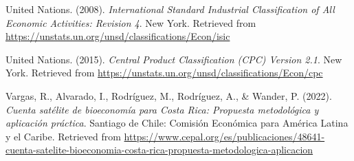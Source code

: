 \documentclass[
  letterpaper,
  DIV=11,
  numbers=noendperiod]{scrartcl}
\newlength{\cslhangindent}
\newenvironment{CSLReferences}[2] %
 {\begin{list}{}{%
  \setlength{\itemindent}{0pt}
  \setlength{\leftmargin}{0pt}
  \setlength{\parsep}{0pt}
  \ifodd #1
   \setlength{\leftmargin}{\cslhangindent}
   \setlength{\itemindent}{-1\cslhangindent}
  \fi
  \setlength{\itemsep}{#2\baselineskip}}}
 {\end{list}}
\begin{document}
\begin{CSLReferences}{1}{0}
United Nations. (2008). \emph{{International} {Standard} {Industrial}
{Classification} of {All} {Economic} {Activities}: {Revision} 4}. New
York. Retrieved from
\url{https://unstats.un.org/unsd/classifications/Econ/isic}

United Nations. (2015). \emph{{Central} {Product} {Classification} (CPC)
{Version} 2.1}. New York. Retrieved from
\url{https://unstats.un.org/unsd/classifications/Econ/cpc}

Vargas, R., Alvarado, I., Rodríguez, M., Rodríguez, A., \& Wander, P.
(2022). \emph{Cuenta satélite de bioeconomía para Costa Rica: Propuesta
metodológica y aplicación práctica}. Santiago de Chile: Comisión
Económica para América Latina y el Caribe. Retrieved from
\url{https://www.cepal.org/es/publicaciones/48641-cuenta-satelite-bioeconomia-costa-rica-propuesta-metodologica-aplicacion}

\end{CSLReferences}
\end{document}
